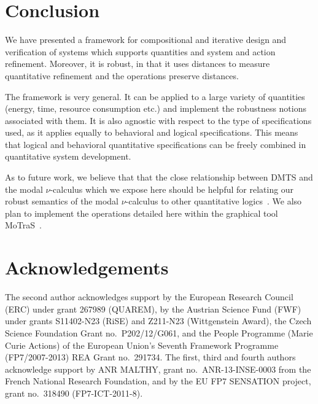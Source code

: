 \documentclass[twocolumn]{svjour3-dummy}
\begin{document}
\section{Conclusion}

We have presented a framework for compositional and iterative design and
verification of systems which supports quantities and system and action
refinement.  Moreover, it is robust, in that it uses distances to
measure quantitative refinement and the operations preserve
distances.

The framework is very general.  It can be applied to a large variety of
quantities (energy, time, resource consumption etc.) and implement the
robustness notions associated with them.  It is also agnostic with
respect to the type of specifications used, as it applies equally to
behavioral and logical specifications.  This means that logical and
behavioral quantitative specifications can be freely combined in
quantitative system development.

As to future work, we believe that that the close relationship between
DMTS and the modal $\nu$-calculus which we expose here should be helpful
for relating our robust semantics of the modal $\nu$-calculus to other
quantitative logics~\cite{DBLP:conf/lics/HuthK97,
  DBLP:conf/fossacs/Mio11, DBLP:conf/concur/Alfaro03}.  We also plan to
implement the operations detailed here within the graphical tool
MoTraS~\cite{motras}.

\section*{Acknowledgements}

The second author acknowledges support by the European Research
Council (ERC) under grant 267989 (QUAREM), by the Austrian Science
Fund (FWF) under grants S11402-N23 (RiSE) and Z211-N23 (Wittgenstein
Award), the Czech Science Foundation Grant no.\ P202/12/G061, and the
People Programme (Marie Curie Actions) of the European Union's Seventh
Framework Programme (FP7/2007-2013) REA Grant no.\ 291734.  The first,
third and fourth authors acknowledge support by ANR MALTHY, grant
no.\ ANR-13-INSE-0003 from the French National Research Foundation, and
by the EU FP7 SENSATION project, grant no.\ 318490 (FP7-ICT-2011-8).
\end{document}
